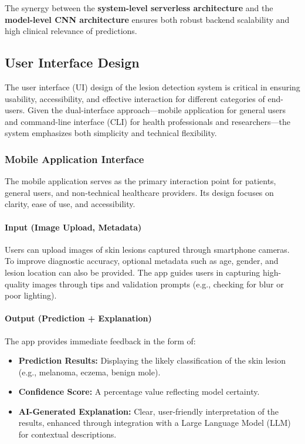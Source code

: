 \documentclass[
  12pt,
  oneside]{article}
\providecommand{\tightlist}{%
  \setlength{\itemsep}{0pt}\setlength{\parskip}{0pt}}
\begin{document}
The synergy between the \textbf{system-level serverless architecture}
and the \textbf{model-level CNN architecture} ensures both robust
backend scalability and high clinical relevance of predictions.

\subsection{User Interface Design}\label{user-interface-design}

The user interface (UI) design of the lesion detection system is
critical in ensuring usability, accessibility, and effective interaction
for different categories of end-users. Given the dual-interface
approach---mobile application for general users and command-line
interface (CLI) for health professionals and researchers---the system
emphasizes both simplicity and technical flexibility.

\subsubsection{Mobile Application
Interface}\label{mobile-application-interface}

The mobile application serves as the primary interaction point for
patients, general users, and non-technical healthcare providers. Its
design focuses on clarity, ease of use, and accessibility.

\paragraph{Input (Image Upload,
Metadata)}\label{input-image-upload-metadata}

Users can upload images of skin lesions captured through smartphone
cameras. To improve diagnostic accuracy, optional metadata such as age,
gender, and lesion location can also be provided. The app guides users
in capturing high-quality images through tips and validation prompts
(e.g., checking for blur or poor lighting).

\paragraph{Output (Prediction +
Explanation)}\label{output-prediction-explanation}

The app provides immediate feedback in the form of:

\begin{itemize}
\tightlist
\item
  \textbf{Prediction Results:} Displaying the likely classification of
  the skin lesion (e.g., melanoma, eczema, benign mole).\\
\item
  \textbf{Confidence Score:} A percentage value reflecting model
  certainty.\\
\item
  \textbf{AI-Generated Explanation:} Clear, user-friendly interpretation
  of the results, enhanced through integration with a Large Language
  Model (LLM) for contextual descriptions.
\end{itemize}
\end{document}
